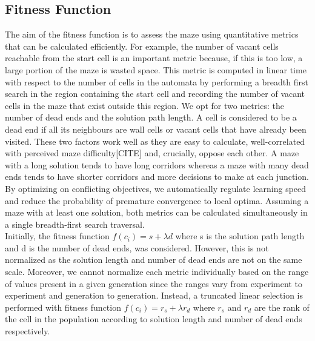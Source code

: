 \subsection{Fitness Function}
The aim of the fitness function is to assess the maze using quantitative metrics that can be calculated efficiently. For example, the number of vacant cells reachable from the start cell is an important metric because, if this is too low, a large portion of the maze is wasted space. This metric is computed in linear time with respect to the number of cells in the automata by performing a breadth first search in the region containing the start cell and recording the number of vacant cells in the maze that exist outside this region. We opt for two metrics: the number of dead ends and the solution path length. A cell is considered to be a dead end if all its neighbours are wall cells or vacant cells that have already been visited. These two factors work well as they are easy to calculate, well-correlated with perceived maze difficulty[CITE] and, crucially, oppose each other. A maze with a long solution tends to have long corridors whereas a maze with many dead ends tends to have shorter corridors and more decisions to make at each junction. By optimizing on conflicting objectives, we automatically regulate learning speed and reduce the probability of premature convergence to local optima. Assuming a maze with at least one solution, both metrics can be calculated simultaneously in a single breadth-first search traversal.\\
Initially, the fitness function $f(c_i) = s + \lambda d$ where s is the solution path length and d is the number of dead ends, was considered. However, this is not normalized as the solution length and number of dead ends are not on the same scale. Moreover, we cannot normalize each metric individually based on the range of values present in a given generation since the ranges vary from experiment to experiment and generation to generation. Instead, a truncated linear selection is performed with fitness function $f(c_i) = r_s + \lambda r_d$ where $r_s$ and $r_d$ are the rank of the cell in the population according to solution length and number of dead ends respectively.